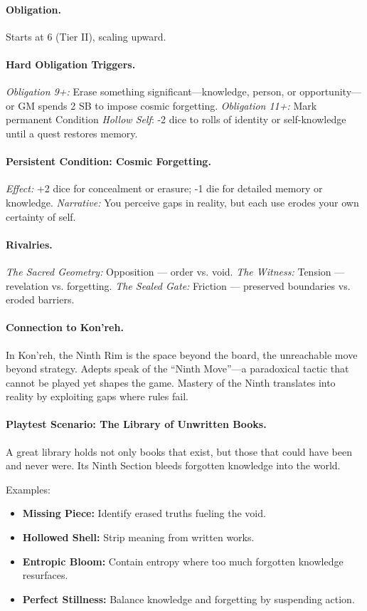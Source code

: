 \paragraph{Obligation.} Starts at 6 (Tier II), scaling upward.

\paragraph{Hard Obligation Triggers.}  
\emph{Obligation 9+:} Erase something significant—knowledge, person, or opportunity—or GM spends 2 SB to impose cosmic forgetting.  
\emph{Obligation 11+:} Mark permanent Condition \emph{Hollow Self}: -2 dice to rolls of identity or self-knowledge until a quest restores memory.

\paragraph{Persistent Condition: Cosmic Forgetting.}  
\emph{Effect:} +2 dice for concealment or erasure; -1 die for detailed memory or knowledge.  
\emph{Narrative:} You perceive gaps in reality, but each use erodes your own certainty of self.

\paragraph{Rivalries.}  
\emph{The Sacred Geometry:} Opposition --- order vs. void.  
\emph{The Witness:} Tension --- revelation vs. forgetting.  
\emph{The Sealed Gate:} Friction --- preserved boundaries vs. eroded barriers.

\paragraph{Connection to Kon'reh.}  
In Kon'reh, the Ninth Rim is the space beyond the board, the unreachable move beyond strategy. Adepts speak of the ``Ninth Move''—a paradoxical tactic that cannot be played yet shapes the game. Mastery of the Ninth translates into reality by exploiting gaps where rules fail.

\paragraph{Playtest Scenario: The Library of Unwritten Books.}  
A great library holds not only books that exist, but those that could have been and never were. Its Ninth Section bleeds forgotten knowledge into the world.  

Examples:  
\begin{itemize}
  \item \textbf{Missing Piece:} Identify erased truths fueling the void.  
  \item \textbf{Hollowed Shell:} Strip meaning from written works.  
  \item \textbf{Entropic Bloom:} Contain entropy where too much forgotten knowledge resurfaces.  
  \item \textbf{Perfect Stillness:} Balance knowledge and forgetting by suspending action.  
\end{itemize}
